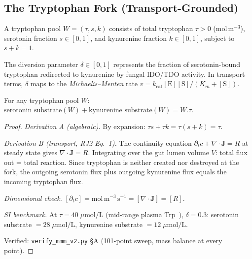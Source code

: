 \subsection{The Tryptophan Fork (Transport-Grounded)}

\begin{definition}
A tryptophan pool $W = (\tau, s, k)$ consists of total tryptophan
$\tau > 0$ (mol\,m$^{-3}$), serotonin fraction $s \in [0,1]$, and
kynurenine fraction $k \in [0,1]$, subject to $s + k = 1$.
\end{definition}

\begin{definition}
\label{def:diversion}
The diversion parameter $\delta \in [0,1]$ represents the fraction of
serotonin-bound tryptophan redirected to kynurenine by fungal IDO/TDO
activity. In transport terms, $\delta$ maps to the \emph{Michaelis--Menten}
rate $v = k_\mathrm{cat}[\mathrm{E}][\mathrm{S}]/(K_m + [\mathrm{S}])$.
\end{definition}

\begin{theorem}
\label{thm:mass}
For any tryptophan pool $W$:
$\mathrm{serotonin\_substrate}(W) + \mathrm{kynurenine\_substrate}(W) = W.\tau$.

\begin{proof}
\emph{Derivation A (algebraic).} By expansion: $\tau s + \tau k = \tau(s+k) = \tau$.

\emph{Derivation B (transport, RJ2 Eq.~1).}
The continuity equation $\partial_t c + \nabla\cdot\mathbf{J} = R$ at
steady state gives $\nabla\cdot\mathbf{J} = R$. Integrating over the
gut lumen volume $V$: total flux out = total reaction. Since tryptophan
is neither created nor destroyed at the fork, the outgoing serotonin
flux plus outgoing kynurenine flux equals the incoming tryptophan flux.

\emph{Dimensional check.}
$[\partial_t c] = \mathrm{mol\,m^{-3}\,s^{-1}} = [\nabla\cdot\mathbf{J}] = [R]$. \checkmark

\emph{SI benchmark.}
At $\tau = 40\;\mu\mathrm{mol/L}$ (mid-range plasma Trp~\cite{fernstrom71}),
$\delta = 0.3$: serotonin substrate $= 28\;\mu\mathrm{mol/L}$,
kynurenine substrate $= 12\;\mu\mathrm{mol/L}$.

Verified: \texttt{verify\_mmm\_v2.py} \S A (101-point sweep, mass balance
at every point).
\qedhere
\end{proof}
\end{theorem}

